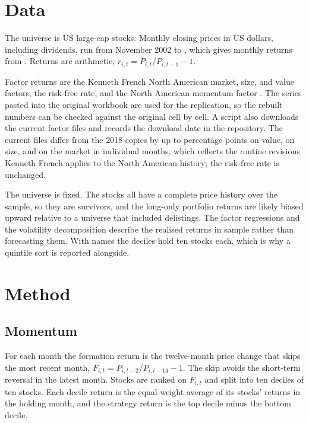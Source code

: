 \documentclass[11pt]{article}
\begin{document}
\section{Data}

The universe is \nStocks{} US large-cap stocks. Monthly closing prices in US dollars, including
dividends, run from November 2002 to \sampleEnd{}, which gives \nMonths{} monthly returns from
\sampleStart{}. Returns are arithmetic, $r_{i,t} = P_{i,t}/P_{i,t-1} - 1$.

Factor returns are the Kenneth French North American market, size, and value factors, the
risk-free rate, and the North American momentum factor \citep{fama1993, fama2012, frenchdata}. The
series pasted into the original workbook are used for the replication, so the rebuilt numbers can
be checked against the original cell by cell. A script also downloads the current factor files and
records the download date in the repository. The current files differ from the 2018 copies by up
to \revHml{} percentage points on value, \revSmb{} on size, and \revMkt{} on the market in
individual months, which reflects the routine revisions Kenneth French applies to the North
American history; the risk-free rate is unchanged.

The universe is fixed. The \nStocks{} stocks all have a complete price history over the sample, so
they are survivors, and the long-only portfolio returns are likely biased upward relative to a
universe that included delistings. The factor regressions and the volatility decomposition describe
the realised returns in sample rather than forecasting them. With \nStocks{} names the deciles hold
ten stocks each, which is why a quintile sort is reported alongside.

\section{Method}

\subsection{Momentum}

For each month the formation return is the twelve-month price change that skips the most recent
month, $F_{i,t} = P_{i,t-2}/P_{i,t-14} - 1$. The skip avoids the short-term reversal in the latest
month. Stocks are ranked on $F_{i,t}$ and split into ten deciles of ten stocks. Each decile return
is the equal-weight average of its stocks' returns in the holding month, and the strategy return is
the top decile minus the bottom decile.
\end{document}

